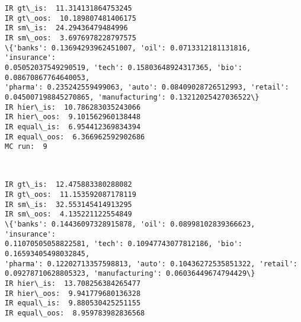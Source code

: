 \documentclass[11pt]{article}
\begin{document}
    \begin{Verbatim}[commandchars=\\\{\},fontsize=\footnotesize]
IR gt\_is:  11.314131864753245
IR gt\_oos:  10.189807481406175
IR sm\_is:  24.29436479484996
IR sm\_oos:  3.6976978228797575
\{'banks': 0.13694293962451007, 'oil': 0.0713312181131816, 'insurance':
0.05052037549290519, 'tech': 0.15803648924317365, 'bio': 0.08670867764640053,
'pharma': 0.235242559499063, 'auto': 0.08409028726512993, 'retail':
0.045007198845270865, 'manufacturing': 0.13212025427036522\}
IR hier\_is:  10.786283035243066
IR hier\_oos:  9.101562960138448
IR equal\_is:  6.954412369834394
IR equal\_oos:  6.366962592902686
MC run:  9

    \end{Verbatim}

    \begin{center}
    \end{center}
    { \hspace*{\fill} \\}
    
    \begin{Verbatim}[commandchars=\\\{\},fontsize=\footnotesize]
IR gt\_is:  12.475883380288082
IR gt\_oos:  11.153592087178119
IR sm\_is:  32.553145414913295
IR sm\_oos:  4.135221122554849
\{'banks': 0.14436097328915878, 'oil': 0.08998102839366623, 'insurance':
0.11070505058822581, 'tech': 0.10947743077812186, 'bio': 0.16593405498032845,
'pharma': 0.12202713357598813, 'auto': 0.10436272535851322, 'retail':
0.09278710628805323, 'manufacturing': 0.06036449674794429\}
IR hier\_is:  13.708256384265477
IR hier\_oos:  9.941779680136328
IR equal\_is:  9.880530425251155
IR equal\_oos:  8.959783982836568

    \end{Verbatim}
\end{document}
